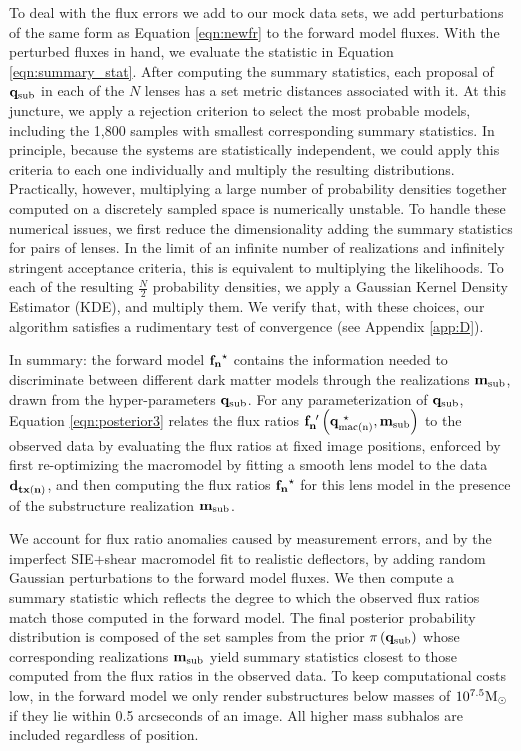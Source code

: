 To deal with the flux errors we add to our mock data sets, we add perturbations of the same form as Equation \ref{eqn:newfr} to the forward model fluxes. With the perturbed fluxes in hand, we evaluate the statistic in Equation \ref{eqn:summary_stat}. After computing the summary statistics, each proposal of ${\bf{q}_{\rm{sub}}}$ in each of the $N$ lenses has a set metric distances associated with it. At this juncture, we apply a rejection criterion to select the most probable models, including the 1,800 samples with smallest corresponding summary statistics. In principle, because the systems are statistically independent, we could apply this criteria to each one individually and multiply the resulting distributions. Practically, however, multiplying a large number of probability densities together computed on a discretely sampled space is numerically unstable. To handle these numerical issues, we first reduce the dimensionality adding the summary statistics for pairs of lenses. In the limit of an infinite number of realizations and infinitely stringent acceptance criteria, this is equivalent to multiplying the likelihoods. To each of the resulting $\frac{N}{2}$ probability densities, we apply a Gaussian Kernel Density Estimator (KDE), and multiply them. We verify that, with these choices, our algorithm satisfies a rudimentary test of convergence (see Appendix \ref{app:D}).

In summary: the forward model ${\bf{f_n}^{\star}}$ contains the information needed to discriminate between different dark matter models through the realizations ${\bf{m}_{\rm{sub}}}$, drawn from the hyper-parameters ${\bf{q}_{\rm{sub}}}$. For any parameterization of ${\bf{q}_{\rm{sub}}}$, Equation \ref{eqn:posterior3} relates the flux ratios ${\bf{f}_{n}^{\ \prime}}\left({\bf{q}_{\rm{mac(n)}}^{\ \star}},{\bf{m}_{\rm{sub}}}\right)$ to the observed data by evaluating the flux ratios at fixed image positions, enforced by first re-optimizing the macromodel by fitting a smooth lens model to the data ${\bf{d}_{tx(n)}}$, and then computing the flux ratios ${\bf{f_n}^{\star}}$ for this lens model in the presence of the substructure realization ${\bf{m}_{\rm{sub}}}$. 

We account for flux ratio anomalies caused by measurement errors, and by the imperfect SIE+shear macromodel fit to realistic deflectors, by adding random Gaussian perturbations to the forward model fluxes. We then compute a summary statistic which reflects the degree to which the observed flux ratios match those computed in the forward model. The final posterior probability distribution is composed of the set samples from the prior $\pi\left({\bf{q}_{\rm{sub}}}\right)$ whose corresponding realizations ${\bf{m}_{\rm{sub}}}$ yield summary statistics closest to those computed from the flux ratios in the observed data. To keep computational costs low, in the forward model we only render substructures below masses of $10^{7.5} {\rm{M}_{\odot}}$ if they lie within 0.5 arcseconds of an image. All higher mass subhalos are included regardless of position.

